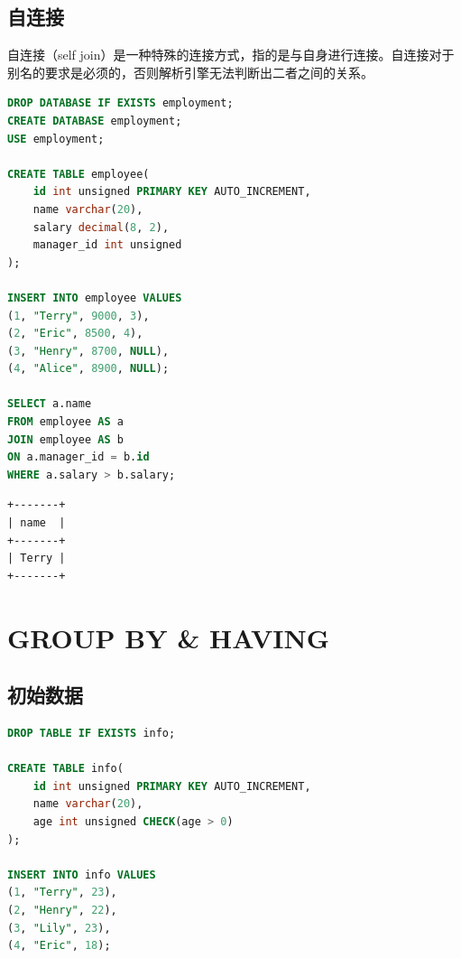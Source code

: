\documentclass[12pt, openany, oneside]{book}
\begin{document}
\section{自连接}

自连接（self join）是一种特殊的连接方式，指的是与自身进行连接。自连接对于别名的要求是必须的，否则解析引擎无法判断出二者之间的关系。 \\


\begin{lstlisting}[language=SQL]
DROP DATABASE IF EXISTS employment;
CREATE DATABASE employment;
USE employment;

CREATE TABLE employee(
    id int unsigned PRIMARY KEY AUTO_INCREMENT,
    name varchar(20),
    salary decimal(8, 2),
    manager_id int unsigned
);

INSERT INTO employee VALUES
(1, "Terry", 9000, 3),
(2, "Eric", 8500, 4),
(3, "Henry", 8700, NULL),
(4, "Alice", 8900, NULL);

SELECT a.name
FROM employee AS a
JOIN employee AS b
ON a.manager_id = b.id
WHERE a.salary > b.salary;
\end{lstlisting}

\begin{tcolorbox}
    \begin{verbatim}
+-------+
| name  |
+-------+
| Terry |
+-------+
	\end{verbatim}
\end{tcolorbox}

\newpage

\chapter{GROUP BY \& HAVING}

\section{初始数据}


\begin{lstlisting}[language=SQL]
DROP TABLE IF EXISTS info;

CREATE TABLE info(
    id int unsigned PRIMARY KEY AUTO_INCREMENT,
    name varchar(20),
    age int unsigned CHECK(age > 0)
);

INSERT INTO info VALUES
(1, "Terry", 23),
(2, "Henry", 22),
(3, "Lily", 23),
(4, "Eric", 18);
\end{lstlisting}
\end{document}

